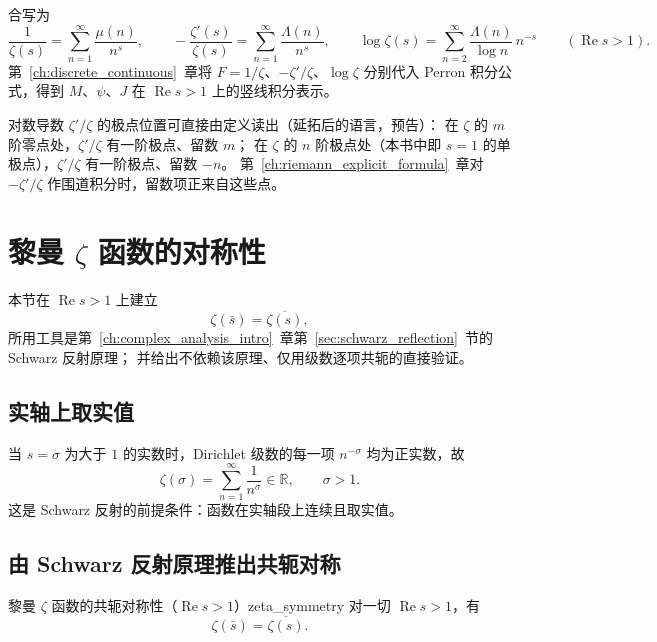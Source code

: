合写为
\begin{equation}
\frac{1}{\zeta(s)} = \sum_{n=1}^{\infty} \frac{\mu(n)}{n^{s}}, \qquad
-\frac{\zeta'(s)}{\zeta(s)} = \sum_{n=1}^{\infty} \frac{\Lambda(n)}{n^{s}}, \qquad
\log\zeta(s) = \sum_{n=2}^{\infty}\frac{\Lambda(n)}{\log n}\,n^{-s}
\qquad (\operatorname{Re}s>1).
\label{eq:mu_Lambda_pair}
\end{equation}
第~\ref{ch:discrete_continuous}~章将 $F=1/\zeta$、$-\zeta'/\zeta$、$\log\zeta$
分别代入 Perron 积分公式，得到 $M$、$\psi$、$J$ 在 $\operatorname{Re}s>1$ 上的竖线积分表示。

对数导数 $\zeta'/\zeta$ 的极点位置可直接由定义读出（延拓后的语言，预告）：
在 $\zeta$ 的 $m$ 阶零点处，$\zeta'/\zeta$ 有一阶极点、留数 $m$；
在 $\zeta$ 的 $n$ 阶极点处（本书中即 $s=1$ 的单极点），$\zeta'/\zeta$ 有一阶极点、留数 $-n$。
第~\ref{ch:riemann_explicit_formula}~章对 $-\zeta'/\zeta$ 作围道积分时，留数项正来自这些点。

\section{黎曼 \texorpdfstring{$\zeta$}{Zeta} 函数的对称性}
\label{sec:schwarz}
\label{sec:zeta_symmetry}

本节在 $\operatorname{Re}s>1$ 上建立
\[
  \zeta(\bar{s})=\overline{\zeta(s)},
\]
所用工具是第~\ref{ch:complex_analysis_intro}~章第~\ref{sec:schwarz_reflection}~节的
Schwarz 反射原理；
并给出不依赖该原理、仅用级数逐项共轭的直接验证。

\subsection{实轴上取实值}

当 $s=\sigma$ 为大于 $1$ 的实数时，Dirichlet 级数的每一项 $n^{-\sigma}$ 均为正实数，故
\begin{equation}
  \zeta(\sigma)
  =\sum_{n=1}^{\infty}\frac{1}{n^{\sigma}}
  \in\mathbb{R},
  \qquad \sigma>1.
  \label{eq:zeta_real_on_real}
\end{equation}
这是 Schwarz 反射的前提条件：函数在实轴段上连续且取实值。

\subsection{由 Schwarz 反射原理推出共轭对称}

\begin{theorem}{黎曼 $\zeta$ 函数的共轭对称性（$\operatorname{Re}s>1$）}{zeta_symmetry}
\label{cor:zeta_symmetry}
对一切 $\operatorname{Re}s>1$，有
\begin{equation}
  \zeta(\bar{s})
  =\overline{\zeta(s)}.
  \label{eq:zeta_symmetry}
\end{equation}
\end{theorem}

